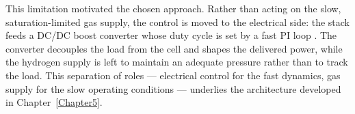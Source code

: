 This limitation motivated the chosen approach. Rather than acting on the slow,
saturation-limited gas supply, the control is moved to the electrical side: the
stack feeds a DC/DC boost converter whose duty cycle is set by a fast PI loop
\cite{derbeli2017}. The converter decouples the load from the cell and shapes the
delivered power, while the hydrogen supply is left to maintain an adequate
pressure rather than to track the load. This separation of roles --- electrical
control for the fast dynamics, gas supply for the slow operating conditions ---
underlies the architecture developed in Chapter~\ref{Chapter5}.
